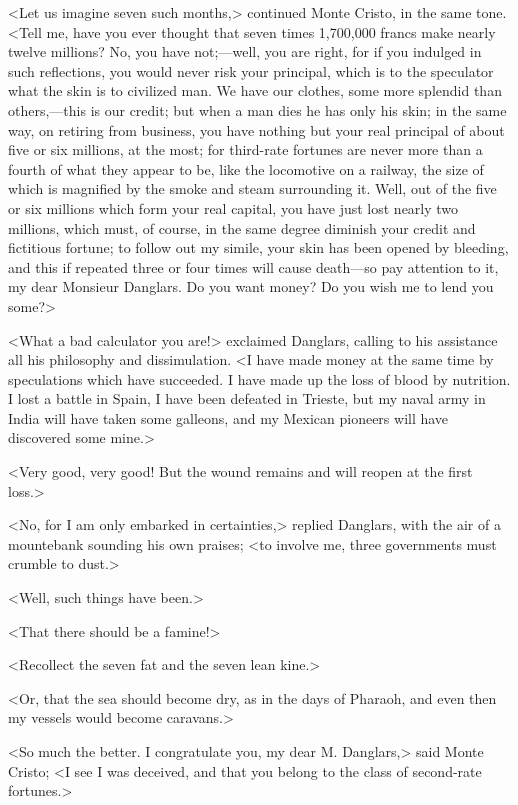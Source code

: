  <Let us imagine seven such months,> continued Monte Cristo, in the same tone. <Tell me, have you ever thought that seven times 1,700,000 francs make nearly twelve millions? No, you have not;—well, you are right, for if you indulged in such reflections, you would never risk your principal, which is to the speculator what the skin is to civilized man. We have our clothes, some more splendid than others,—this is our credit; but when a man dies he has only his skin; in the same way, on retiring from business, you have nothing but your real principal of about five or six millions, at the most; for third-rate fortunes are never more than a fourth of what they appear to be, like the locomotive on a railway, the size of which is magnified by the smoke and steam surrounding it. Well, out of the five or six millions which form your real capital, you have just lost nearly two millions, which must, of course, in the same degree diminish your credit and fictitious fortune; to follow out my simile, your skin has been opened by bleeding, and this if repeated three or four times will cause death—so pay attention to it, my dear Monsieur Danglars. Do you want money? Do you wish me to lend you some?>

<What a bad calculator you are!> exclaimed Danglars, calling to his assistance all his philosophy and dissimulation. <I have made money at the same time by speculations which have succeeded. I have made up the loss of blood by nutrition. I lost a battle in Spain, I have been defeated in Trieste, but my naval army in India will have taken some galleons, and my Mexican pioneers will have discovered some mine.> 

 <Very good, very good! But the wound remains and will reopen at the first loss.> 

 <No, for I am only embarked in certainties,> replied Danglars, with the air of a mountebank sounding his own praises; <to involve me, three governments must crumble to dust.> 

 <Well, such things have been.> 

 <That there should be a famine!> 

 <Recollect the seven fat and the seven lean kine.> 

 <Or, that the sea should become dry, as in the days of Pharaoh, and even then my vessels would become caravans.> 

 <So much the better. I congratulate you, my dear M. Danglars,> said Monte Cristo; <I see I was deceived, and that you belong to the class of second-rate fortunes.> 

